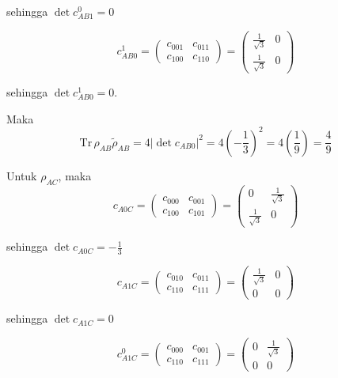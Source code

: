 sehingga $\det c_{AB1}^0 = 0$

\begin{equation}
	c_{AB0}^1=
	\begin{pmatrix}
		c_{001} & c_{011} \\
		c_{100} & c_{110}
	\end{pmatrix}=
	\begin{pmatrix}
		\frac{1}{\sqrt{3}} & 0 \\
		\frac{1}{\sqrt{3}} & 0
	\end{pmatrix}
\end{equation}

sehingga $\det c_{AB0}^1 = 0$.

Maka
\begin{equation}
	\mathrm{Tr}\,\rho_{AB}\tilde{\rho}_{AB}=4|\det c_{AB0}|^2=4(-\frac{1}{3})^2=4(\frac{1}{9})=\frac{4}{9}
\end{equation}

Untuk $\rho_{AC}$, maka
\begin{equation}
	c_{A0C}=
	\begin{pmatrix}
		c_{000} & c_{001} \\
		c_{100} & c_{101}
	\end{pmatrix}=
	\begin{pmatrix}
		0 & \frac{1}{\sqrt{3}} \\
		\frac{1}{\sqrt{3}} & 0
	\end{pmatrix}
\end{equation}

sehingga $\det c_{A0C} = -\frac{1}{3}$

\begin{equation}
	c_{A1C}=
	\begin{pmatrix}
		c_{010} & c_{011} \\
		c_{110} & c_{111}
	\end{pmatrix}=
	\begin{pmatrix}
		\frac{1}{\sqrt{3}} & 0 \\
		0 & 0
	\end{pmatrix}
\end{equation}

sehingga $\det c_{A1C} = 0$

\begin{equation}
	c_{A1C}^0=
	\begin{pmatrix}
		c_{000} & c_{001} \\
		c_{110} & c_{111}
	\end{pmatrix}=
	\begin{pmatrix}
		0 & \frac{1}{\sqrt{3}} \\
		0 & 0
	\end{pmatrix}
\end{equation}

